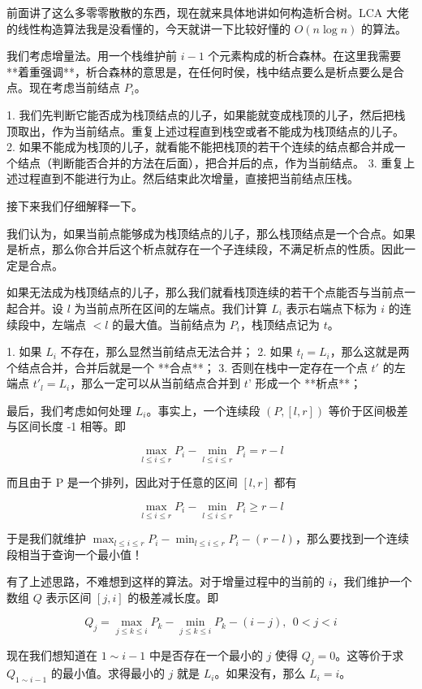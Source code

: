 \documentclass{ctexart}
\begin{document}
前面讲了这么多零零散散的东西，现在就来具体地讲如何构造析合树。LCA 大佬的线性构造算法我是没看懂的，今天就讲一下比较好懂的 $O(n\log n)$ 的算法。

我们考虑增量法。用一个栈维护前 $i-1$ 个元素构成的析合森林。在这里我需要 **着重强调**，析合森林的意思是，在任何时侯，栈中结点要么是析点要么是合点。现在考虑当前结点 $P_i$。

1. 我们先判断它能否成为栈顶结点的儿子，如果能就变成栈顶的儿子，然后把栈顶取出，作为当前结点。重复上述过程直到栈空或者不能成为栈顶结点的儿子。
2. 如果不能成为栈顶的儿子，就看能不能把栈顶的若干个连续的结点都合并成一个结点（判断能否合并的方法在后面），把合并后的点，作为当前结点。
3. 重复上述过程直到不能进行为止。然后结束此次增量，直接把当前结点压栈。

接下来我们仔细解释一下。

我们认为，如果当前点能够成为栈顶结点的儿子，那么栈顶结点是一个合点。如果是析点，那么你合并后这个析点就存在一个子连续段，不满足析点的性质。因此一定是合点。

如果无法成为栈顶结点的儿子，那么我们就看栈顶连续的若干个点能否与当前点一起合并。设 $l$ 为当前点所在区间的左端点。我们计算 $L_i$ 表示右端点下标为 $i$ 的连续段中，左端点 $< l$ 的最大值。当前结点为 $P_i$，栈顶结点记为 $t$。

1. 如果 $L_i$ 不存在，那么显然当前结点无法合并；
2. 如果 $t_l=L_i$，那么这就是两个结点合并，合并后就是一个 **合点**；
3. 否则在栈中一定存在一个点 $t'$ 的左端点 ${t'}_l=L_i$，那么一定可以从当前结点合并到 $t’$ 形成一个 **析点**；

最后，我们考虑如何处理 $L_i$。事实上，一个连续段 $(P,[l,r])$ 等价于区间极差与区间长度 -1 相等。即

$$
\max_{l\le i\le r}P_i-\min_{l\le i\le r}P_i=r-l
$$

而且由于 P 是一个排列，因此对于任意的区间 $[l,r]$ 都有

$$
\max_{l\le i\le r}P_i-\min_{l\le i\le r}P_i\ge r-l
$$

于是我们就维护 $\max_{l\le i\le r}P_i-\min_{l\le i\le r}P_i-(r-l)$，那么要找到一个连续段相当于查询一个最小值！

有了上述思路，不难想到这样的算法。对于增量过程中的当前的 $i$，我们维护一个数组 $Q$ 表示区间 $[j,i]$ 的极差减长度。即

$$
Q_j=\max_{j\le k\le i}P_k-\min_{j\le k\le i}P_k-(i-j),\ \ 0<j<i
$$

现在我们想知道在 $1\sim i-1$ 中是否存在一个最小的 $j$ 使得 $Q_j=0$。这等价于求 $Q_{1\sim i-1}$ 的最小值。求得最小的 $j$ 就是 $L_i$。如果没有，那么 $L_i=i$。
\end{document}
